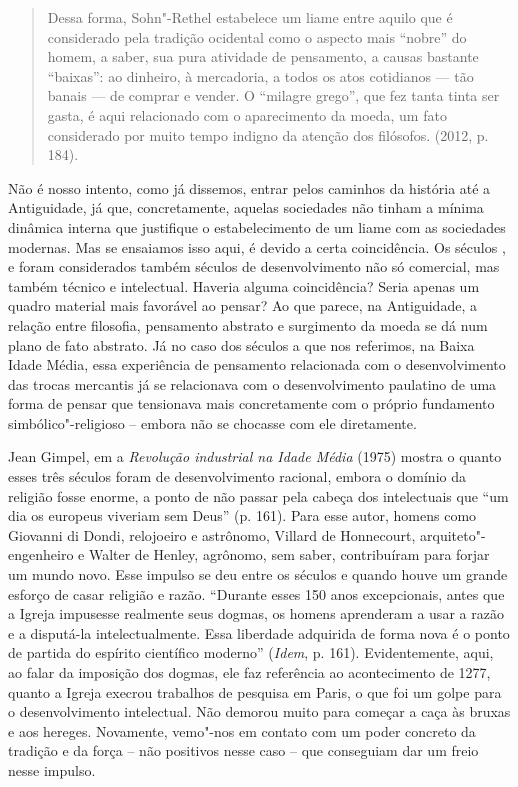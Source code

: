 \begin{quote}
Dessa forma, Sohn"-Rethel estabelece um liame entre aquilo que é
considerado pela tradição ocidental como o aspecto mais ``nobre'' do
homem, a saber, sua pura atividade de pensamento, a causas bastante
``baixas'': ao dinheiro, à mercadoria, a todos os atos cotidianos ---
tão banais --- de comprar e vender. O ``milagre grego'', que fez tanta
tinta ser gasta, é aqui relacionado com o aparecimento da moeda, um fato
considerado por muito tempo indigno da atenção dos filósofos. (2012, p.
184).
\end{quote}

Não é nosso intento, como já dissemos, entrar pelos caminhos da história
até a Antiguidade, já que, concretamente, aquelas sociedades não tinham
a mínima dinâmica interna que justifique o estabelecimento de um liame
com as sociedades modernas. Mas se ensaiamos isso aqui, é devido a certa
coincidência. Os séculos ,  e  foram considerados também
séculos de desenvolvimento não só comercial, mas também técnico e
intelectual. Haveria alguma coincidência? Seria apenas um quadro
material mais favorável ao pensar? Ao que parece, na Antiguidade, a
relação entre filosofia, pensamento abstrato e surgimento da moeda se dá
num plano de fato abstrato. Já no caso dos séculos a que nos referimos,
na Baixa Idade Média, essa experiência de pensamento relacionada com o
desenvolvimento das trocas mercantis já se relacionava com o
desenvolvimento paulatino de uma forma de pensar que tensionava mais
concretamente com o próprio fundamento simbólico"-religioso -- embora não
se chocasse com ele diretamente.

Jean Gimpel, em a \emph{Revolução industrial na Idade Média} (1975)
mostra o quanto esses três séculos foram de desenvolvimento racional,
embora o domínio da religião fosse enorme, a ponto de não passar pela
cabeça dos intelectuais que ``um dia os europeus viveriam sem Deus'' (p.
161). Para esse autor, homens como Giovanni di Dondi, relojoeiro e
astrônomo, Villard de Honnecourt, arquiteto"-engenheiro e Walter de
Henley, agrônomo, sem saber, contribuíram para forjar um mundo novo.
Esse impulso se deu entre os séculos  e  quando houve um grande
esforço de casar religião e razão. ``Durante esses 150 anos
excepcionais, antes que a Igreja impusesse realmente seus dogmas, os
homens aprenderam a usar a razão e a disputá-la intelectualmente. Essa
liberdade adquirida de forma nova é o ponto de partida do espírito
científico moderno'' (\emph{Idem}, p. 161). Evidentemente, aqui, ao
falar da imposição dos dogmas, ele faz referência ao acontecimento de
1277, quanto a Igreja execrou trabalhos de pesquisa em Paris, o que foi
um golpe para o desenvolvimento intelectual. Não demorou muito para
começar a caça às bruxas e aos hereges. Novamente, vemo"-nos em contato
com um poder concreto da tradição e da força -- não positivos nesse caso
-- que conseguiam dar um freio nesse impulso.

